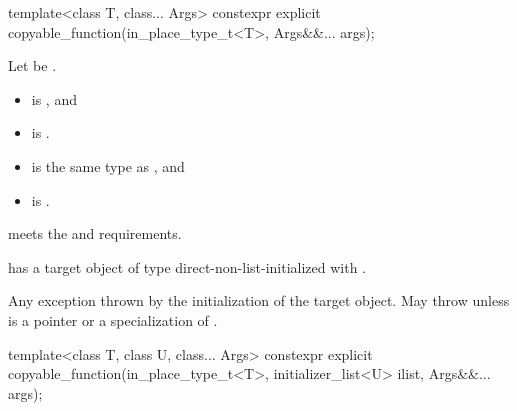 %
\begin{itemdecl}
template<class T, class... Args>
  constexpr explicit copyable_function(in_place_type_t<T>, Args&&... args);
\end{itemdecl}

\begin{itemdescr}
\pnum
Let  be .

\pnum
\constraints
\begin{itemize}
\item {} is , and
\item {} is .
\end{itemize}

\pnum
\mandates
\begin{itemize}
\item {} is the same type as , and
\item {} is .
\end{itemize}

\pnum
\expects
{} meets the  and  requirements.

\pnum
\ensures
{} has a target object of type  direct-non-list-initialized with .

\pnum
\throws
Any exception thrown by the initialization of the target object. May throw  unless  is a pointer or a specialization of .
\end{itemdescr}

%
\begin{itemdecl}
template<class T, class U, class... Args>
  constexpr explicit copyable_function(in_place_type_t<T>, initializer_list<U> ilist, Args&&... args);
\end{itemdecl}

